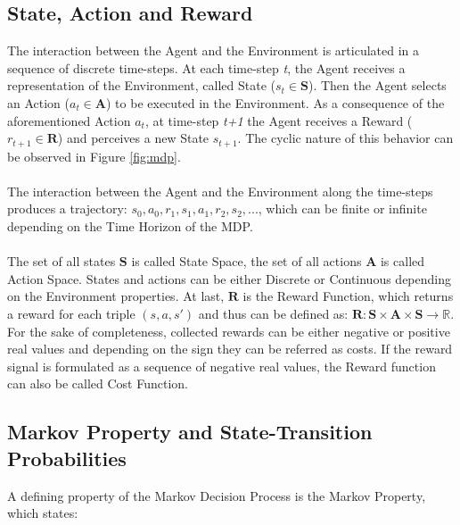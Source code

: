         \subsection{State, Action and Reward}
            \label{subs:sar}
            The interaction between the Agent and the Environment is articulated in a sequence of discrete time-steps. At each time-step \textit{t}, the Agent receives a representation of the Environment, called State ($s_t\in \mathbf{S}$). Then the Agent selects an Action ($a_t\in \mathbf{A}$)  to be executed in the Environment. As a consequence of the aforementioned Action $a_t$, at time-step \textit{t+1} the Agent receives a Reward ($r_{t+1}\in \mathbf{R}$) and perceives a new State $s_{t+1}$. The cyclic nature of this behavior can be observed in Figure \ref{fig:mdp}. 
            \\\\
            The interaction between the Agent and the Environment along the time-steps produces a trajectory: $s_0, a_0, r_1, s_1, a_1, r_2, s_2, ...$, which can be finite or infinite depending on the Time Horizon of the MDP.
            \\\\
            The set of all states $\mathbf{S}$ is called State Space, the set of all actions $\mathbf{A}$ is called Action Space. States and actions can be either Discrete or Continuous depending on the Environment properties. At last, $\mathbf{R}$ is the Reward Function, which returns a reward for each triple $(s, a, s')$ and thus can be defined as: $\mathbf{R}: \mathbf{S} \times \mathbf{A} \times \mathbf{S} \rightarrow \mathds{R} $. For the sake of completeness, collected rewards can be either negative or positive real values and depending on the sign they can be referred as costs. If the reward signal is formulated as a sequence of negative real values, the Reward function can also be called Cost Function.
            
        \subsection{Markov Property and State-Transition Probabilities}
            \label{subs:markov}
            A defining property of the Markov Decision Process is the Markov Property, which states: 
            
